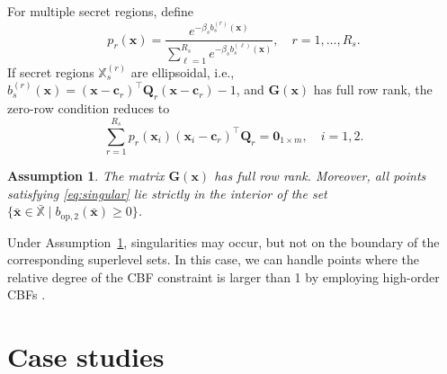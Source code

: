 \documentclass[journal,twoside,web]{ieeecolor}
\newtheorem{assumption}[theorem]{Assumption}
\begin{document}
For multiple secret regions, define
\[
    p_r(\mathbf{x}) = \frac{e^{-\beta_s b_s^{(r)}(\mathbf{x})}} {\sum_{\ell=1}^{R_s} e^{-\beta_s b_s^{(\ell)}(\mathbf{x})}}, \quad r=1,\ldots,R_s.
\]
If secret regions $\mathbb{X}_s^{(r)}$ are ellipsoidal, i.e., $b_s^{(r)}(\mathbf{x}) = (\mathbf{x}-\mathbf{c}_r)^\top \mathbf{Q}_r (\mathbf{x}-\mathbf{c}_r) - 1$, and $\mathbf{G}(\mathbf{x})$ has full row rank, the zero-row condition reduces to
\begin{equation} \label{eq:singular}
    \sum_{r=1}^{R_s} p_r(\mathbf{x}_i) (\mathbf{x}_i-\mathbf{c}_r)^\top \mathbf{Q}_r = \mathbf{0}_{1\times m}, \quad i=1,2.
\end{equation}
\begin{assumption} \label{ass:singular_points}
    The matrix $\mathbf{G}(\mathbf{x})$ has full row rank. Moreover, all points satisfying \eqref{eq:singular} lie strictly in the interior of the set $\{\bar{\mathbf{x}} \in \bar{\mathbb{X}} \mid b_{\mathrm{op},2}(\bar{\mathbf{x}})\ge 0\}$.
\end{assumption}
Under Assumption~\ref{ass:singular_points}, singularities may occur, but not on the boundary of the corresponding superlevel sets. In this case, we can handle points where the relative degree of the CBF constraint is larger than 1 by employing high-order CBFs \cite{tan2022}.

\section{Case studies}
\label{sec:case_study}
\end{document}
